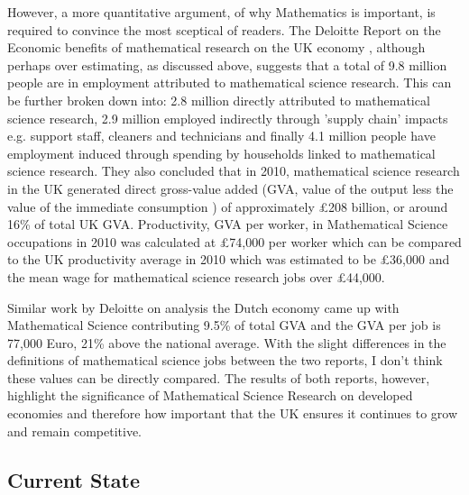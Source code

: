 \documentclass[11pt]{article} %
\begin{document}
However, a more quantitative argument, of why Mathematics is important, is required to convince the most sceptical of readers. The Deloitte Report on the Economic benefits of mathematical research on the UK economy \cite{deloitteuk}, although perhaps over estimating, as discussed above, suggests that a total of 9.8 million people are in employment attributed to mathematical science research. This can be further broken down into: 2.8 million  directly attributed to mathematical science research, 2.9 million employed indirectly through 'supply chain' impacts e.g. support staff, cleaners and technicians and finally 4.1 million people have employment induced  through spending by households linked to mathematical science research. They also concluded that in 2010, mathematical science research in the UK generated direct gross-value added (GVA, value of the output less the value of the immediate consumption ) of approximately £208 billion, or around 16\% of total UK GVA.  Productivity, GVA per worker, in Mathematical Science occupations in 2010 was calculated at £74,000 per worker which can be compared to the UK productivity average in 2010 which was estimated to be £36,000 and the mean wage for mathematical science research jobs over £44,000. 
 
 Similar work by Deloitte on analysis the Dutch economy \cite{deloitteNL} came up with Mathematical Science contributing 9.5\% of total GVA and the GVA per job is 77,000 Euro, 21\% above the national average. With the slight differences in the  definitions of mathematical science jobs between the two reports, I don't think these values can be directly compared. The results of both reports, however,  highlight the significance of Mathematical Science Research on developed economies and therefore how important that the UK ensures it continues to grow and remain competitive.
 
 
	
	 
	\subsection{Current State \label{current state }}
	
\end{document}
